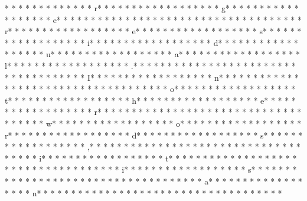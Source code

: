 *  * * *  *  * * *  *  * * *  * r* * *  * * *  * * *  *  * * *  *  * * *  * g* * *  * * *  * * *  *  * * *  *  * * *  * e* * *  * * *  * * *  *  * * *  *  * * *  *  * * *  * * *  * * *  *  * * *  *  * * *  * r* * *  * * *  * * *  *  * * *  *  * * *  * e* * *  * * *  * * *  *  * * *  *  * * *  * s* * *  * * *  * * *  *  * * *  *  * * *  * i* * *  * * *  * * *  *  * * *  *  * * *  * d* * *  * * *  * * *  *  * * *  *  * * *  * u* * *  * * *  * * *  *  * * *  *  * * *  * a* * *  * * *  * * *  *  * * *  *  * * *  * l* * *  * * *  * * *  *  * * *  *  * * *  * .* * *  * * *  * * *  *  * * *  *  * * *  *  * * *  * * *  * * *  *  * * *  *  * * *  * I* * *  * * *  * * *  *  * * *  *  * * *  * n* * *  * * *  * * *  *  * * *  *  * * *  *  * * *  * * *  * * *  *  * * *  *  * * *  * o* * *  * * *  * * *  *  * * *  *  * * *  * t* * *  * * *  * * *  *  * * *  *  * * *  * h* * *  * * *  * * *  *  * * *  *  * * *  * e* * *  * * *  * * *  *  * * *  *  * * *  * r* * *  * * *  * * *  *  * * *  *  * * *  *  * * *  * * *  * * *  *  * * *  *  * * *  * w* * *  * * *  * * *  *  * * *  *  * * *  * o* * *  * * *  * * *  *  * * *  *  * * *  * r* * *  * * *  * * *  *  * * *  *  * * *  * d* * *  * * *  * * *  *  * * *  *  * * *  * s* * *  * * *  * * *  *  * * *  *  * * *  * ,* * *  * * *  * * *  *  * * *  *  * * *  *  * * *  * * *  * * *  *  * * *  *  * * *  * i* * *  * * *  * * *  *  * * *  *  * * *  * t* * *  * * *  * * *  *  * * *  *  * * *  *  * * *  * * *  * * *  *  * * *  *  * * *  * i* * *  * * *  * * *  *  * * *  *  * * *  * s* * *  * * *  * * *  *  * * *  *  * * *  *  * * *  * * *  * * *  *  * * *  *  * * *  * a* * *  * * *  * * *  *  * * *  *  * * *  * n* * *  * * *  * * *  *  * * *  *  * * *  *  * * *  * * *  * * *  *  * * *  *  * * *  * 
